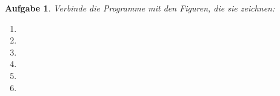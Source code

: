 \documentclass{article}
\newtheorem{aufgabe}{Aufgabe}[section]
\begin{document}
\begin{aufgabe} \label{quadrate}
Verbinde die Programme mit den Figuren, die sie zeichnen:
\begin{paracol}{2}
\begin{enumerate}[(1)]
\item
\begin{minipage}{\linewidth}

\end{minipage}

\item
\begin{minipage}{\linewidth}

\end{minipage}

\item
\begin{minipage}{\linewidth}

\end{minipage}

\item
\begin{minipage}{\linewidth}

\end{minipage}

\item
\begin{minipage}{\linewidth}

\end{minipage}

\item
\begin{minipage}{\linewidth}

\end{minipage}
\end{enumerate}

\switchcolumn


\end{paracol}
\end{aufgabe}
\end{document}
